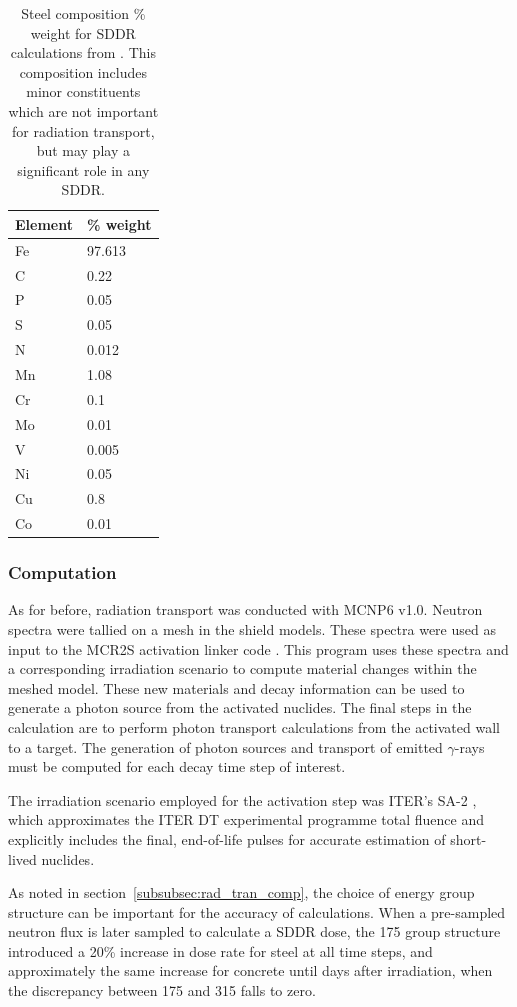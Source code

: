 \begin{table}[H]
  \centering
  \begin{tabu} to 0.3\textwidth {X X}
    \toprule
    Element & \% weight \\
    \midrule
    Fe & 97.613 \\
    C  & 0.22 \\
    P  & 0.05 \\
    S  & 0.05 \\
    N  & 0.012 \\
    Mn & 1.08 \\
    Cr & 0.1 \\
    Mo & 0.01 \\ 
    V  & 0.005 \\
    Ni & 0.05 \\
    Cu & 0.8 \\
    Co & 0.01 \\
    \bottomrule
  \end{tabu}
  \caption{Steel composition \% weight for SDDR calculations from \cite{Barabash16}. This composition includes minor constituents which are not important for radiation transport, but may play a significant role in any SDDR.}
  \label{tab:sddr_steel}
\end{table}

\subsubsection{Computation}
As for before, radiation transport was conducted with MCNP6 v1.0. Neutron spectra were tallied on a mesh in the shield models. These spectra were used as input to the MCR2S activation linker code \cite{Davis2010a}. This program uses these spectra and a corresponding irradiation scenario to compute material changes within the meshed model. These new materials and decay information can be used to generate a photon source from the activated nuclides. The final steps in the calculation are to perform photon transport calculations from the activated wall to a target. The generation of photon sources and transport of emitted $\gamma$-rays must be computed for each decay time step of interest.

The irradiation scenario employed for the activation step was ITER's SA-2 \cite{Loughlin09}, which approximates the ITER DT experimental programme total fluence and explicitly includes the final, end-of-life pulses for accurate estimation of short-lived nuclides.

As noted in section~\ref{subsubsec:rad_tran_comp}, the choice of energy group structure can be important for the accuracy of calculations. When a pre-sampled neutron flux is later sampled to calculate a SDDR dose, the 175 group structure introduced a 20\% increase in dose rate for steel at all time steps, and approximately the same increase for concrete until days after irradiation, when the discrepancy between 175 and 315 falls to zero.

